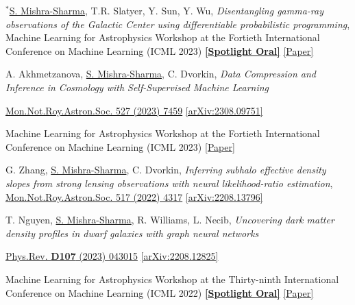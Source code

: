 \documentclass[letterpaper,11pt]{article}
\newenvironment{packed_itemize}{
\begin{itemize}[label=\raisebox{0.25ex}{\tiny$\bullet$}]
  \setlength{\itemsep}{4.0pt}
  \setlength{\parskip}{0pt}
  \setlength{\parsep}{0pt}}{\end{itemize}
}
\newenvironment{packed_enumerate}[1][]{
\begin{etaremune}[#1]
  \setlength{\itemsep}{4.0pt}
  \setlength{\parskip}{0pt}
  \setlength{\parsep}{0pt}}{\end{etaremune}
}
\begin{document}
\begin{packed_enumerate}[start=56]
\begin{packed_itemize}
       \end{packed_itemize}
  \item $^*$\underline{S. Mishra-Sharma}, T.R. Slatyer, Y. Sun, Y. Wu, \emph{Disentangling gamma-ray observations of the Galactic Center using differentiable probabilistic programming}, {Machine Learning for Astrophysics Workshop at the Fortieth International Conference on Machine Learning (ICML 2023)} \href{https://ml4astro.github.io/icml2023/}{\textbf{[Spotlight Oral]}} \href{https://ml4astro.github.io/icml2023/assets/52.pdf}{[Paper]}
  \item A. Akhmetzanova, \underline{S. Mishra-Sharma}, C. Dvorkin, \emph{Data Compression and Inference in Cosmology with Self-Supervised Machine Learning}
  \begin{packed_itemize}
      \item \href{https://doi.org/10.1093/mnras/stad3646}{Mon.Not.Roy.Astron.Soc. 527 (2023) 7459} \href{https://arxiv.org/abs/2308.09751}{[arXiv:2308.09751]}
      \item {Machine Learning for Astrophysics Workshop at the Fortieth International Conference on Machine Learning (ICML 2023)} \href{https://ml4astro.github.io/icml2023/assets/11.pdf}{[Paper]} 
       \end{packed_itemize}
      
  \item G. Zhang, \underline{S. Mishra-Sharma}, C. Dvorkin, \emph{Inferring subhalo effective density slopes from strong lensing observations with neural likelihood-ratio estimation}, \href{https://doi.org/10.1093/mnras/stac3014}{Mon.Not.Roy.Astron.Soc. 517 (2022) 4317} \href{https://arxiv.org/abs/2208.13796}{[arXiv:2208.13796]}
  \item T. Nguyen, \underline{S. Mishra-Sharma}, R. Williams, L. Necib, \emph{Uncovering dark matter density profiles in dwarf galaxies with graph neural networks}
  \begin{packed_itemize}
      \item {\href{https://journals.aps.org/prd/abstract/10.1103/PhysRevD.107.043015}{Phys.Rev. \textbf{D107} (2023) 043015}} \href{https://arxiv.org/abs/2208.12825}{[arXiv:2208.12825]}
      \item Machine Learning for Astrophysics Workshop at the Thirty-ninth International Conference on Machine Learning (ICML 2022) \href{https://ml4astro.github.io/icml2022/}{\textbf{[Spotlight Oral]}} \href{https://ml4astro.github.io/icml2022/assets/38.pdf}{[Paper]}
    \end{packed_itemize}
    

\end{packed_enumerate}
\end{document}
